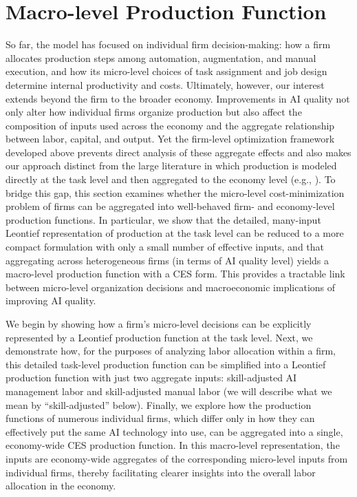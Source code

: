 \section{Macro-level Production Function}
\label{sec:aggregation}

So far, the model has focused on individual firm decision-making: how a firm allocates production steps among automation, augmentation, and manual execution, and how its micro-level choices of task assignment and job design determine internal productivity and costs.
Ultimately, however, our interest extends beyond the firm to the broader economy. 
Improvements in AI quality not only alter how individual firms organize production but also affect the composition of inputs used across the economy and the aggregate relationship between labor, capital, and output.
Yet the firm-level optimization framework developed above prevents direct analysis of these aggregate effects and also makes our approach distinct from the large literature in which production is modeled directly at the task level and then aggregated to the economy level (e.g., \cite{acemoglu2022artificial, acemoglu2024tasks, acemoglu2025simple}).
To bridge this gap, this section examines whether the micro-level cost-minimization problem of firms can be aggregated into well-behaved firm- and economy-level production functions. 
In particular, we show that the detailed, many-input Leontief representation of production at the task level can be reduced to a more compact formulation with only a small number of effective inputs, and that aggregating across heterogeneous firms (in terms of AI quality level) yields a macro-level production function with a CES form. 
This provides a tractable link between micro-level organization decisions and macroeconomic implications of improving AI quality.

We begin by showing how a firm's micro-level decisions can be explicitly represented by a Leontief production function at the task level.
Next, we demonstrate how, for the purposes of analyzing labor allocation within a firm, this detailed task-level production function can be simplified into a Leontief production function with just two aggregate inputs: skill-adjusted AI management labor and skill-adjusted manual labor (we will describe what we mean by ``skill-adjusted'' below).
Finally, we explore how the production functions of numerous individual firms, which differ only in how they can effectively put the same AI technology into use, can be aggregated into a single, economy-wide CES production function.
In this macro-level representation, the inputs are economy-wide aggregates of the corresponding micro-level inputs from individual firms, thereby facilitating clearer insights into the overall labor allocation in the economy.

